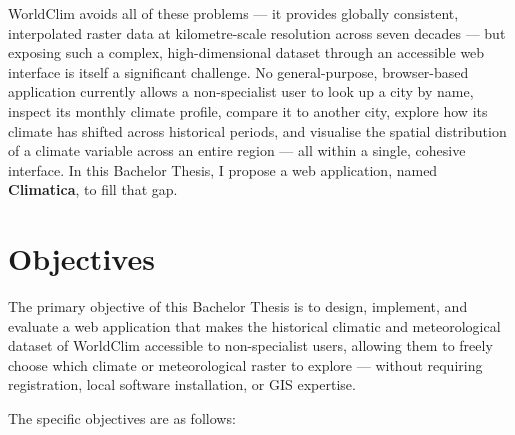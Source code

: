 WorldClim avoids all of these problems --- it provides globally consistent,
interpolated raster data at kilometre-scale resolution across seven decades ---
but exposing such a complex, high-dimensional dataset through an accessible
web interface is itself a significant challenge. No general-purpose,
browser-based application currently allows a non-specialist user to look up a
city by name, inspect its monthly climate profile, compare it to another city,
explore how its climate has shifted across historical periods, and visualise the
spatial distribution of a climate variable across an entire region --- all
within a single, cohesive interface. In this Bachelor Thesis, I propose a web 
application, named \textbf{Climatica}, to fill that gap.

\section{Objectives}\label{INTRO_OBJ}

The primary objective of this Bachelor Thesis is to design, implement, and
evaluate a web application that makes the historical climatic and meteorological
dataset of WorldClim accessible to non-specialist users, allowing them to
freely choose which climate or meteorological raster to explore --- without
requiring registration, local software installation, or GIS expertise.

The specific objectives are as follows:

